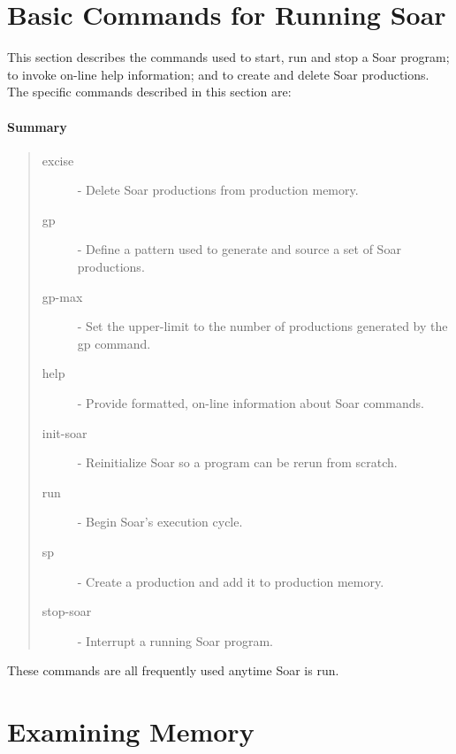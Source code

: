\section{Basic Commands for Running Soar}
\label{BASIC}

This section describes the commands used to start, run and stop a Soar 
program; to invoke on-line help information; and to create and 
delete Soar productions.  The specific commands described in this
section are:

\paragraph{Summary}
\begin{quote}
\begin{description}
\item[excise] - Delete Soar productions from production memory.
\item[gp] - Define a pattern used to generate and source a set of Soar productions.
\item[gp-max] - Set the upper-limit to the number of productions generated by the gp command.
\item[help] - Provide formatted, on-line information about Soar commands.
\item[init-soar] - Reinitialize Soar so a program can be rerun from scratch.
\item[run] - Begin Soar's execution cycle.
\item[sp] - Create a production and add it to production memory.
\item[stop-soar] - Interrupt a running Soar program.
\end{description}
\end{quote}
These commands are all frequently used anytime Soar is run.










\section{Examining Memory}
\label{MEMORY}

